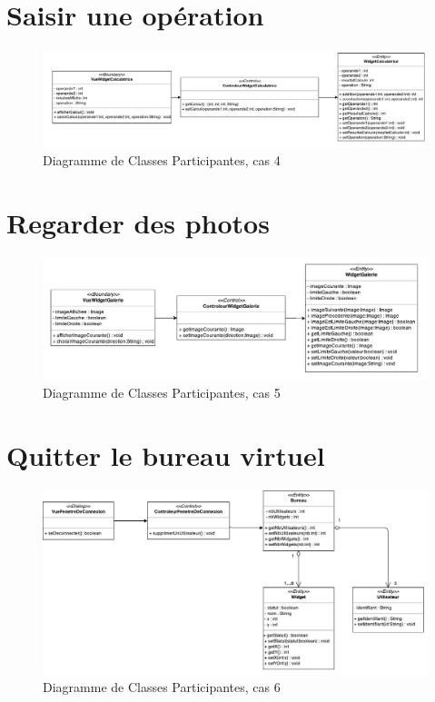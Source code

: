 
\section{Saisir une opération}
\noindent\begin{figure}[H]
	\centering
	\includegraphics[angle=90,scale=0.9]{diagrammes/DCP4.pdf}
	\caption{Diagramme de Classes Participantes, cas 4}
\end{figure}

\section{Regarder des photos}
\begin{figure}[H]
	\centering
	\includegraphics[angle=90]{diagrammes/DCP5.pdf}
	\caption{Diagramme de Classes Participantes, cas 5}
\end{figure}

\section{Quitter le bureau virtuel}

\begin{figure}[H]
	\centering
	\includegraphics[angle=90]{diagrammes/DCP6.pdf}
	\caption{Diagramme de Classes Participantes, cas 6}
\end{figure}